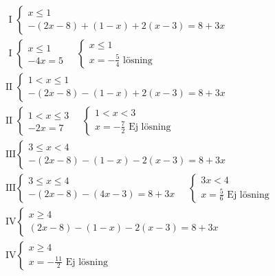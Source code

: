 \begin{align*}
&\quad \text{ I } \left\{ \begin{array} { l } { x \leq 1 } \\ { - ( 2 x - 8 ) + ( 1 - x ) + 2 ( x - 3 ) = 8 + 3 x } \end{array} \right. \\
&\quad \text{ I } \left\{ \begin{array} { l } { x \leq 1 } \\ { - 4 x = 5 } \end{array}  \quad \left\{ \begin{array} { l } { x \leq 1 } \\ { x = - \frac { 5 } { 4 } \text{ lösning}} \end{array} \right. \right. \\
&\quad \text{II } \left\{ \begin{array} { l } { 1 < x \leq 1 } \\ { - ( 2 x - 8 ) - ( 1 - x ) + 2 ( x - 3 ) = 8 + 3 x } \end{array} \right. \\
&\quad \text{II } \left\{ \begin{array} { l } { 1 < x \leq 3 } \\ { - 2 x = 7 } \end{array} \quad \left\{ \begin{array} { l } { 1 < x < 3 } \\ { x = - \frac { 7 } { 2 } \text{ Ej lösning} } \end{array} \right. \right. \\
&\quad \text{III} \left\{ \begin{array} { l } { 3 \leq x < 4 } \\ { - ( 2 x - 8 ) - ( 1 - x ) - 2 ( x - 3 ) = 8 + 3 x } \end{array} \right. \\
&\quad \text{III} \left\{ \begin{array} { l } { 3 \leq x \leq 4 } \\ { - ( 2 x - 8 ) - ( 4 x - 3 ) = 8 + 3 x } \end{array} \quad \left\{ \begin{array} { l } { 3x < 4 } \\ { x = \frac { 5 } { 6 } \text{ Ej lösning} } \end{array} \right. \right. \\
&\quad \text{IV} \left\{ \begin{array} { l } { x \geq 4 } \\ { ( 2 x - 8 ) - ( 1 - x ) - 2 ( x - 3 ) = 8 + 3 x } \end{array} \right. \\
&\quad \text{IV} \left\{ \begin{array} { l } { x \geq 4 } \\ { x = - \frac { 11 } { 2 } \text{ Ej lösning} } \end{array} \right. \\ 
\end{align*}


